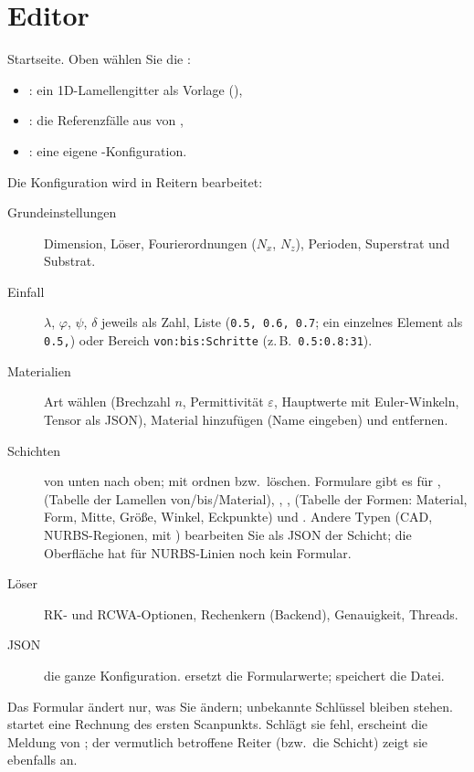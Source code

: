 \section{Editor}
Startseite. Oben wählen Sie die :
\begin{itemize}
  \item {}: ein 1D-Lamellengitter als Vorlage (),
  \item {}: die Referenzfälle aus  von \FG,
  \item {}: eine eigene -Konfiguration.
\end{itemize}
Die Konfiguration wird in Reitern bearbeitet:
\begin{description}
  \item[Grundeinstellungen] Dimension, Löser, Fourierordnungen ($N_x$, $N_z$), Perioden, Superstrat und Substrat.
  \item[Einfall] $\lambda$, $\varphi$, $\psi$, $\delta$ jeweils als Zahl, Liste (\texttt{0.5, 0.6, 0.7}; ein einzelnes
        Element als \texttt{0.5,}) oder Bereich \texttt{von:bis:Schritte} (z.\,B.\ \texttt{0.5:0.8:31}).
  \item[Materialien] Art wählen (Brechzahl $n$, Permittivität $\varepsilon$, Hauptwerte mit Euler-Winkeln, Tensor als
        JSON), Material hinzufügen (Name eingeben) und entfernen.
  \item[Schichten] von unten nach oben; mit \gui{$\uparrow$} \gui{$\downarrow$} \gui{$\times$} ordnen bzw.\ löschen. Formulare gibt es für
        ,  (Tabelle der Lamellen von/bis/Material), , ,
         (Tabelle der Formen: Material, Form, Mitte, Größe, Winkel, Eckpunkte) und .
        Andere Typen (CAD, NURBS-Regionen,  mit ) bearbeiten Sie als JSON der Schicht; die
        Oberfläche hat für NURBS-Linien noch kein Formular.
  \item[Löser] RK- und RCWA-Optionen, Rechenkern (Backend), Genauigkeit, Threads.
  \item[JSON] die ganze Konfiguration.  ersetzt die Formularwerte;  speichert die
        Datei.
\end{description}
Das Formular ändert nur, was Sie ändern; unbekannte Schlüssel bleiben stehen.  startet eine Rechnung
des ersten Scanpunkts. Schlägt sie fehl, erscheint die Meldung von \FG; der vermutlich betroffene Reiter (bzw.\ die
Schicht) zeigt sie ebenfalls an.

